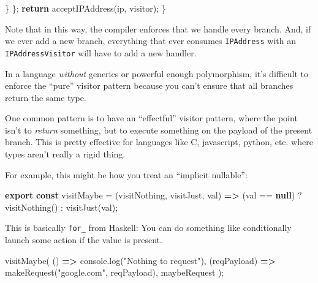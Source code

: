 \documentclass[]{article}
\newenvironment{Shaded}{}{}
\newcommand{\BuiltInTok}[1]{\textcolor[rgb]{0.00,0.50,0.00}{#1}}
\newcommand{\ControlFlowTok}[1]{\textcolor[rgb]{0.00,0.44,0.13}{\textbf{#1}}}
\newcommand{\FunctionTok}[1]{\textcolor[rgb]{0.02,0.16,0.49}{#1}}
\newcommand{\ImportTok}[1]{\textcolor[rgb]{0.00,0.50,0.00}{\textbf{#1}}}
\newcommand{\KeywordTok}[1]{\textcolor[rgb]{0.00,0.44,0.13}{\textbf{#1}}}
\newcommand{\NormalTok}[1]{#1}
\newcommand{\OperatorTok}[1]{\textcolor[rgb]{0.40,0.40,0.40}{#1}}
\newcommand{\StringTok}[1]{\textcolor[rgb]{0.25,0.44,0.63}{#1}}
\begin{document}
\begin{Shaded}
\begin{Highlighting}[]
        \OperatorTok{\}}
    \OperatorTok{\};}
    \ControlFlowTok{return}\NormalTok{ acceptIPAddress}\OperatorTok{(}\NormalTok{ip}\OperatorTok{,}\NormalTok{ visitor}\OperatorTok{);}
\OperatorTok{\}}
\end{Highlighting}
\end{Shaded}

Note that in this way, the compiler enforces that we handle every branch. And,
if we ever add a new branch, everything that ever consumes \texttt{IPAddress}
with an \texttt{IPAddressVisitor} will have to add a new handler.

In a language \emph{without} generics or powerful enough polymorphism, it's
difficult to enforce the ``pure'' visitor pattern because you can't ensure that
all branches return the same type.

One common pattern is to have an ``effectful'' visitor pattern, where the point
isn't to \emph{return} something, but to execute something on the payload of the
present branch. This is pretty effective for languages like C, javascript,
python, etc. where types aren't really a rigid thing.

For example, this might be how you treat an ``implicit nullable'':

\begin{Shaded}
\begin{Highlighting}[]
\ImportTok{export} \KeywordTok{const}\NormalTok{ visitMaybe }\OperatorTok{=}\NormalTok{ (visitNothing}\OperatorTok{,}\NormalTok{ visitJust}\OperatorTok{,}\NormalTok{ val) }\KeywordTok{=\textgreater{}}
\NormalTok{  (val }\OperatorTok{==} \KeywordTok{null}\NormalTok{) }\OperatorTok{?} \FunctionTok{visitNothing}\NormalTok{() }\OperatorTok{:} \FunctionTok{visitJust}\NormalTok{(val)}\OperatorTok{;}
\end{Highlighting}
\end{Shaded}

This is basically \texttt{for\_} from Haskell: You can do something like
conditionally launch some action if the value is present.

\begin{Shaded}
\begin{Highlighting}[]
\FunctionTok{visitMaybe}\NormalTok{(}
\NormalTok{  () }\KeywordTok{=\textgreater{}} \BuiltInTok{console}\OperatorTok{.}\FunctionTok{log}\NormalTok{(}\StringTok{"Nothing to request"}\NormalTok{)}\OperatorTok{,}
\NormalTok{  (reqPayload) }\KeywordTok{=\textgreater{}} \FunctionTok{makeRequest}\NormalTok{(}\StringTok{"google.com"}\OperatorTok{,}\NormalTok{ reqPayload)}\OperatorTok{,}
\NormalTok{  maybeRequest}
\NormalTok{)}\OperatorTok{;}
\end{Highlighting}
\end{Shaded}
\end{document}
